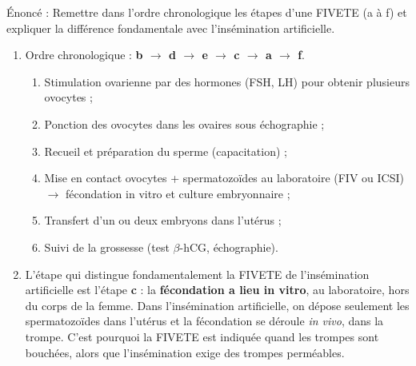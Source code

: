 \documentclass[11pt]{article}
\begin{document}
\begin{corrige}
Énoncé : Remettre dans l'ordre chronologique les étapes d'une FIVETE (a à f) et expliquer la différence fondamentale avec l'insémination artificielle.
\tcblower
\begin{enumerate}
\item Ordre chronologique : \textbf{b $\to$ d $\to$ e $\to$ c $\to$ a $\to$ f}.
\begin{enumerate}
\item[b.] Stimulation ovarienne par des hormones (FSH, LH) pour obtenir plusieurs ovocytes ;
\item[d.] Ponction des ovocytes dans les ovaires sous échographie ;
\item[e.] Recueil et préparation du sperme (capacitation) ;
\item[c.] Mise en contact ovocytes + spermatozoïdes au laboratoire (FIV ou ICSI) $\to$ fécondation in vitro et culture embryonnaire ;
\item[a.] Transfert d'un ou deux embryons dans l'utérus ;
\item[f.] Suivi de la grossesse (test $\beta$-hCG, échographie).
\end{enumerate}
\item L'étape qui distingue fondamentalement la FIVETE de l'insémination artificielle est l'étape \textbf{c} : la \textbf{fécondation a lieu in vitro}, au laboratoire, hors du corps de la femme. Dans l'insémination artificielle, on dépose seulement les spermatozoïdes dans l'utérus et la fécondation se déroule \emph{in vivo}, dans la trompe. C'est pourquoi la FIVETE est indiquée quand les trompes sont bouchées, alors que l'insémination exige des trompes perméables.
\end{enumerate}
\end{corrige}
\end{document}
